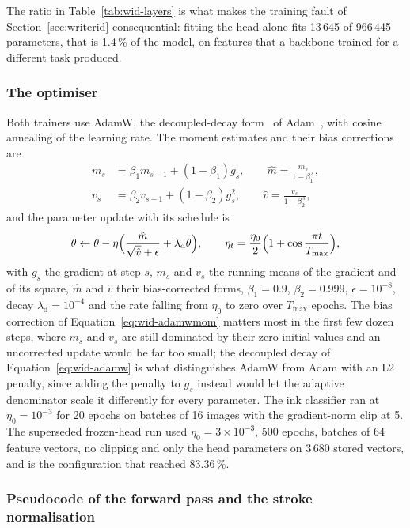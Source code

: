 The ratio in Table~\ref{tab:wid-layers} is what makes the training fault of Section~\ref{sec:writerid} consequential: fitting the head alone fits 13\,645 of 966\,445 parameters, that is 1.4\,\% of the model, on features that a backbone trained for a different task produced.

\subsubsection{The optimiser}

Both trainers use AdamW, the decoupled-decay form~\cite[Alg.~2]{loshchilov2019} of Adam~\cite[Alg.~1]{kingma2015}, with cosine annealing of the learning rate.
The moment estimates and their bias corrections are
\begin{align}
m_s&=\beta_1m_{s-1}+(1-\beta_1)g_s,\qquad \hat m=\frac{m_s}{1-\beta_1^{\,s}},\nonumber\\
v_s&=\beta_2v_{s-1}+(1-\beta_2)g_s^2,\qquad \hat v=\frac{v_s}{1-\beta_2^{\,s}},\label{eq:wid-adamwmom}
\end{align}
and the parameter update with its schedule is
\begin{equation}
\theta\leftarrow\theta-\eta\Bigl(\frac{\hat m}{\sqrt{\hat v}+\epsilon}+\lambda_{\mathrm d}\theta\Bigr),\qquad\eta_t=\frac{\eta_0}{2}\Bigl(1+\cos\frac{\pi t}{T_{\max}}\Bigr),\label{eq:wid-adamw}
\end{equation}
with $g_s$ the gradient at step $s$, $m_s$ and $v_s$ the running means of the gradient and of its square, $\hat m$ and $\hat v$ their bias-corrected forms, $\beta_1=0.9$, $\beta_2=0.999$, $\epsilon=10^{-8}$, decay $\lambda_{\mathrm d}=10^{-4}$ and the rate falling from $\eta_0$ to zero over $T_{\max}$ epochs.
The bias correction of Equation~\ref{eq:wid-adamwmom} matters most in the first few dozen steps, where $m_s$ and $v_s$ are still dominated by their zero initial values and an uncorrected update would be far too small; the decoupled decay of Equation~\ref{eq:wid-adamw} is what distinguishes AdamW from Adam with an L2 penalty, since adding the penalty to $g_s$ instead would let the adaptive denominator scale it differently for every parameter.
The ink classifier ran at $\eta_0=10^{-3}$ for 20 epochs on batches of 16 images with the gradient-norm clip at 5.
The superseded frozen-head run used $\eta_0=3\times10^{-3}$, 500 epochs, batches of 64 feature vectors, no clipping and only the head parameters on 3\,680 stored vectors, and is the configuration that reached 83.36\,\%.

\subsubsection{Pseudocode of the forward pass and the stroke normalisation}


